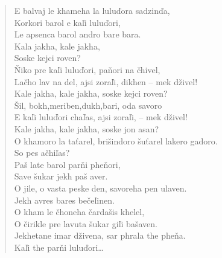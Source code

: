 \begin{verse}
E balvaj le khameha la luluďora sadzinďa, \\
Korkori barol e kaľi luluďori, \\
Le apsenca barol andro bare bara. \\
Kala jakha, kale jakha, \\
Soske kejci roven? \\
Ňiko pre kaľi luluďori, paňori na čhivel, \\
Lačho lav na del, ajsi zoraľi, dikhen – mek dživel! \\
Kale jakha, kale jakha, soske kejci roven? \\
Šil, bokh,meriben,dukh,bari, oda savoro \\
E kaľi luluďori chaľas, ajsi zoraľi, -- mek dživel! \\
Kale jakha, kale jakha, soske jon asan? \\
O khamoro la taťarel, brišindoro šuťarel lakero gadoro. \\
So pes ačhiľas? \\
Paš late barol parňi pheňori, \\
Save šukar jekh paš aver. \\
O jile, o vasta peske den, savoreha pen ulaven. \\
Jekh avres bares bečeľinen. \\
O kham le čhoneha  čardašis khelel, \\
O čirikle pre lavuta šukar giľi bašaven. \\
Jekhetane imar dživena, sar phrala the pheňa. \\
Kaľi the parňi luluďori\ldots
\end{verse}


